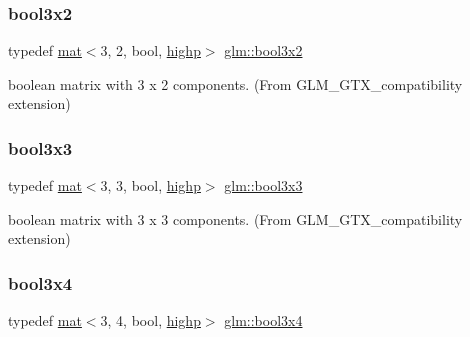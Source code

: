 \subsubsection{\texorpdfstring{bool3x2}{bool3x2}}
{\footnotesize\ttfamily typedef \hyperlink{structglm_1_1mat}{mat}$<$3, 2, bool, \hyperlink{namespaceglm_a36ed105b07c7746804d7fdc7cc90ff25ac6f7eab42eacbb10d59a58e95e362074}{highp}$>$ \hyperlink{group__gtx__compatibility_ga24674530ea1f5c4e78ba3932dcd7504a}{glm\+::bool3x2}}



boolean matrix with 3 x 2 components. (From G\+L\+M\+\_\+\+G\+T\+X\+\_\+compatibility extension) 

\mbox{\label{group__gtx__compatibility_gac56217a837f277fa163565d9858f66cf}} 
\subsubsection{\texorpdfstring{bool3x3}{bool3x3}}
{\footnotesize\ttfamily typedef \hyperlink{structglm_1_1mat}{mat}$<$3, 3, bool, \hyperlink{namespaceglm_a36ed105b07c7746804d7fdc7cc90ff25ac6f7eab42eacbb10d59a58e95e362074}{highp}$>$ \hyperlink{group__gtx__compatibility_gac56217a837f277fa163565d9858f66cf}{glm\+::bool3x3}}



boolean matrix with 3 x 3 components. (From G\+L\+M\+\_\+\+G\+T\+X\+\_\+compatibility extension) 

\mbox{\label{group__gtx__compatibility_ga3bec11b90dfdd4c6b37af3ae6e8f7c29}} 
\subsubsection{\texorpdfstring{bool3x4}{bool3x4}}
{\footnotesize\ttfamily typedef \hyperlink{structglm_1_1mat}{mat}$<$3, 4, bool, \hyperlink{namespaceglm_a36ed105b07c7746804d7fdc7cc90ff25ac6f7eab42eacbb10d59a58e95e362074}{highp}$>$ \hyperlink{group__gtx__compatibility_ga3bec11b90dfdd4c6b37af3ae6e8f7c29}{glm\+::bool3x4}}



